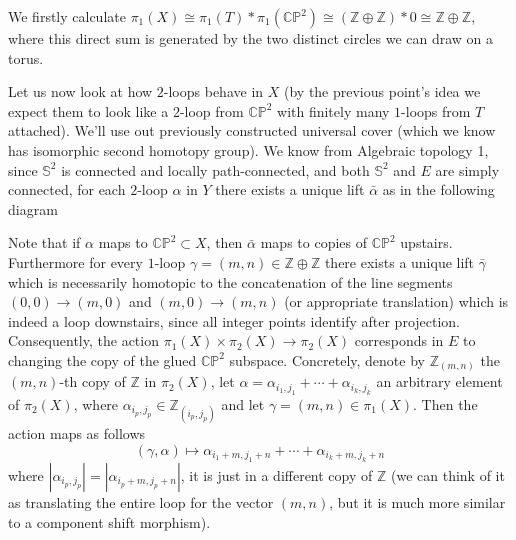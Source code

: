 \documentclass[a4paper, 12pt]{article}
\renewcommand{\S}{\mathbb{S}}
\newcommand{\Z}{\mathbb{Z}}
\newcommand{\C}{\mathbb{C}}
\renewcommand{\P}{\mathbb{P}}
\newcommand{\iso}{\cong}
\begin{document}
\begin{enumerate}[label=(\alph*)]
	We firstly calculate $\pi_1(X) \iso \pi_1(T) * \pi_1(\C\P^2) \iso (\Z \oplus \Z) * 0 \iso \Z \oplus \Z$, where this direct sum is generated by the two distinct circles we can draw on a torus.
	
	Let us now look at how $2$-loops behave in $X$ (by the previous point's idea we expect them to look like a $2$-loop from $\C\P^2$ with finitely many $1$-loops from $T$ attached). We'll use out previously constructed universal cover (which we know has isomorphic second homotopy group). We know from Algebraic topology 1, since $\S^2$ is connected and locally path-connected, and both $\S^2$ and $E$ are simply connected, for each $2$-loop $\alpha$ in $Y$ there exists a unique lift $\bar{\alpha}$ as in the following diagram
	
	\adjustbox{scale=1, center}{
		\begin{tikzcd}
			 & E \arrow[d, "p"] \\
			\S^2 \arrow[r, "\alpha"] \arrow[ru, "\bar{\alpha}"] & X
		\end{tikzcd}
	}	
	Note that if $\alpha$ maps to $\C\P^2 \subset X$, then $\bar{\alpha}$ maps to copies of $\C\P^2$ upstairs. Furthermore for every $1$-loop $\gamma = (m, n) \in \Z\oplus\Z$ there exists a unique lift $\bar{\gamma}$ which is necessarily homotopic to the concatenation of the line segments $(0, 0)\to(m, 0)$ and $(m, 0)\to(m, n)$ (or appropriate translation) which is indeed a loop downstairs, since all integer points identify after projection.
	Consequently, the action $\pi_1(X) \times \pi_2(X) \to \pi_2(X)$ corresponds in $E$ to changing the copy of the glued $\C\P^2$ subspace. Concretely, denote by $\Z_{(m, n)}$ the $(m, n)$-th copy of $\Z$ in $\pi_2(X)$, let $\alpha = \alpha_{i_1, j_1} + \cdots + \alpha_{i_k, j_k}$ an arbitrary element of $\pi_2(X)$, where $\alpha_{i_p, j_p} \in \Z_{(i_p, j_p)}$ and let $\gamma = (m, n) \in \pi_1(X)$. Then the action maps as follows
	\[
	(\gamma, \alpha) \mapsto \alpha_{i_1 + m, j_1 + n} + \cdots + \alpha_{i_k + m, j_k + n}
	\]
	where $|\alpha_{i_p, j_p}| = |\alpha_{i_p + m, j_p + n}|$, it is just in a different copy of $\Z$ (we can think of it as translating the entire loop for the vector $(m, n)$, but it is much more similar to a component shift morphism).
\end{enumerate}
\end{document}
